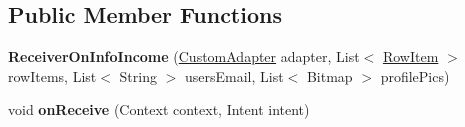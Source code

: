 \subsection*{Public Member Functions}
\begin{DoxyCompactItemize}
\item 
{\bfseries Receiver\+On\+Info\+Income} (\hyperlink{classcom_1_1example_1_1sebastian_1_1tindertp_1_1chatListTools_1_1CustomAdapter}{Custom\+Adapter} adapter, List$<$ \hyperlink{classcom_1_1example_1_1sebastian_1_1tindertp_1_1chatListTools_1_1RowItem}{Row\+Item} $>$ row\+Items, List$<$ String $>$ users\+Email, List$<$ Bitmap $>$ profile\+Pics)\hypertarget{classcom_1_1example_1_1sebastian_1_1tindertp_1_1services_1_1ReceiverOnInfoIncome_a15100ea9ada71218a23c6fdc1be31d55}{}\label{classcom_1_1example_1_1sebastian_1_1tindertp_1_1services_1_1ReceiverOnInfoIncome_a15100ea9ada71218a23c6fdc1be31d55}

\item 
void {\bfseries on\+Receive} (Context context, Intent intent)\hypertarget{classcom_1_1example_1_1sebastian_1_1tindertp_1_1services_1_1ReceiverOnInfoIncome_a0268bbcf6daaee985ca7c8f7e3753681}{}\label{classcom_1_1example_1_1sebastian_1_1tindertp_1_1services_1_1ReceiverOnInfoIncome_a0268bbcf6daaee985ca7c8f7e3753681}

\end{DoxyCompactItemize}
